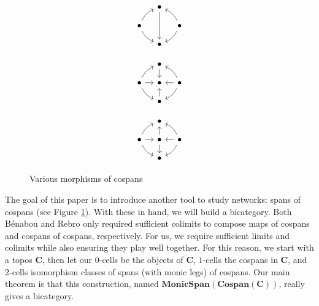 \documentclass[11pt]{amsart}
\newcommand{\cat}[1]{\mathbf{#1}}
\theoremstyle{remark}
\theoremstyle{definition}
\begin{document}
\begin{figure}
	\centering	
	\begin{minipage}[b]{0.3\textwidth}
	\[
	\begin{tikzcd}[column sep=1em,row sep=1em]
		{} &
		{\bullet} 
			\ar[dd]&
		{} \\
		{\bullet} 
			\ar[bend left=20,ru]
			\ar[bend right=20,rd] &
		{}  &
		{\bullet} 
			\ar[bend right=20,lu]
			\ar[bend left=20,ld] \\
		{} &
		{\bullet} &
		{} 
	\end{tikzcd}
	\]
	\label{fig.MapOfCospans}
	\end{minipage}
	\begin{minipage}[b]{0.3\textwidth}
	\[
	\begin{tikzcd}[column sep=1em,row sep=1em]
		{} &
		{\bullet} &
		{} \\
		{\bullet} 
			\ar[bend left=20,ru]
			\ar[r]
			\ar[bend right=20,rd] &
		{\bullet} 
			\ar[u,leftarrow]
			\ar[d,leftarrow] &
		{\bullet} 
			\ar[bend right=20,lu]
			\ar[l]
			\ar[bend left=20,ld] \\
		{} &
		{\bullet} &
		{} 
	\end{tikzcd}
	\]
	\label{fig.CospanOfCospans}
	\end{minipage}
	\begin{minipage}[b]{0.3\textwidth}
	\[
	\begin{tikzcd}[column sep=1em,row sep=1em]
		{} &
		{\bullet} &
		{} \\
		{\bullet} 
			\ar[bend left=20,ru]
			\ar[r]
			\ar[bend right=20,rd] &
		{\bullet} 
			\ar[u]
			\ar[d] &
		{\bullet} 
			\ar[bend right=20,lu]
			\ar[l]
			\ar[bend left=20,ld] \\
		{} &
		{\bullet} &
	{} 
	\end{tikzcd}
	\]
	\label{fig.SpanOfCospans}
\end{minipage}
\caption{Various morphisms of cospans}
\end{figure}

The goal of this paper is to introduce another tool to study networks: spans of cospans (see Figure \ref{fig.SpanOfCospans}). With these in hand, we will build a bicategory.  Both B\'{e}nabou and Rebro only required sufficient colimits to compose maps of cospans and cospans of cospans, respectively. For us, we require sufficient limits and colimits while also ensuring they play well together. For this reason, we start with a topos $\cat{C}$, then let our $0$-cells be the objects of $\cat{C}$, $1$-cells the cospans in $\cat{C}$, and $2$-cells isomorphism classes of spans (with monic legs) of cospans. Our main theorem is that this construction, named $\cat{MonicSpan(Cospan(C))}$, really gives a bicategory. 
\end{document}

